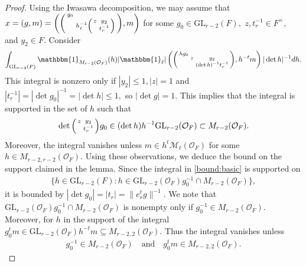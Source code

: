 \documentclass[12pt]{amsart}
\theoremstyle{remark}
\numberwithin{equation}{section}
\newcommand{\GL}{\mathrm{GL}}
\newcommand{\OO}{\mathcal{O}}
\theoremstyle{definition}
\newenvironment{psmatrix}
  {\left(\begin{smallmatrix}}
  {\end{smallmatrix}\right)}
\numberwithin{equation}{subsection}
\newcommand{\one}{\mathbbm{1}}
\newcommand{\norm}[1]{\lVert#1\rVert}
\begin{document}
\begin{proof}
Using the Iwasawa decomposition, we may assume that 
$x=(g,m)=\left(\begin{psmatrix} g_0 &  \\ & h_\ell^{-1}\begin{psmatrix} z & y_2 \\ & t_r^{-1}\end{psmatrix}\end{psmatrix},m\right)$ for some $g_0 \in \GL_{r-2}(F),$ $z,t_r^{-1} \in F^\times,$ and $y_2 \in F.$ 
Consider 
\begin{align*}
\int_{\GL_{r-2}(F)}\one_{M_{r-2}(\mathcal{O}_F)}(h)|\one_\ell|\left( \begin{psmatrix} hg_0 & & \\ & z & y_2\\ & & (\det h)^{-1}t_{r}^{-1} \end{psmatrix},h^{-t}m\right)|\det h|^{-1}dh.
\end{align*}
This integral is nonzero only if $|y_2|\le 1, |z|=1$ and $|t_{r}^{-1}|=|\det g_0|^{-1}=|\det h|\le 1,$ so $|\det g|=1.$  This implies that the integral is supported in the set of $h$ such that 
\begin{align*}
\det \begin{psmatrix} z & y_2 \\ & t_{r}^{-1} \end{psmatrix} g_0 \in (\det h) h^{-1}\GL_{r-2}(\OO_F) \subset M_{r-2}(\OO_F).
\end{align*}
Moreover, the integral vanishes unless $m \in h^{t}\mathcal{M}_{\ell}(\OO_F)$ for some $h \in M_{r-2,r-2}(\OO_F).$ 
Using these observations, we deduce the bound on the support claimed in the lemma. Since the integral in \eqref{bound:basic} is supported on
\begin{align*}
    \{h \in \GL_{r-2}(F) : h\in \GL_{r-2}(\OO_F)g_0^{-1}\cap M_{r-2}(\OO_F)\},
\end{align*}
it is bounded by $|\det g_0|=|t_r|=\norm{e_r^tg}^{-1}$. We note that $\GL_{r-2}(\OO_F)g_0^{-1}\cap M_{r-2}(\OO_F)$ is nonempty only if $g_0^{-1}\in M_{r-2}(\OO_F).$  Moreover, for $h$ in the support of the integral $g_0^tm\in \GL_{r-2}(\OO_F)h^{-t}m\subseteq M_{r-2,2}(\mathcal{O}_F).$ Thus the integral vanishes unless
\begin{align} \label{int:cond}
g_0^{-1} \in M_{r-2}(\OO_F) \quad\textrm{and}\quad g_0^tm\in M_{r-2,2}(\mathcal{O}_F).
\end{align}


\end{proof}
\end{document}
